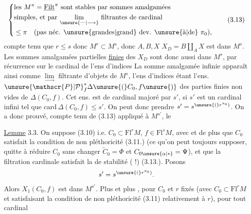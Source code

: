 \[
\left\{\begin{aligned}
&\text{les }M^\pi=\underline{\mathrm{Filt}}^\pi\text{ sont stables par sommes amalgamées}\\
&\text{simples, et par }\underset{\unsure{\mathrel{\text{---}}|\longrightarrow}}{\lim}\text{ filtrantes de cardinal}\\
&\le\pi\quad\text{(pas néc. \unsure{grandes|grand} dev. \unsure{à|de} }\pi_0),
\end{aligned}\right.
\tag*{(3.13)}
\]
compte tenu que $r\le s$ donc $M^r\subset M^s$, donc $A,B,X$  $X_D=B\amalg_A X$ est dans $M^s$. Les sommes amalgamées partielles \uline{finies} des $X_D$ sont donc aussi dans $M^s$, par récurrence sur le cardinal de l'ens d'indices\unsure{;|,}  La somme amalgamée infinie apparaît ainsi comme $\underset{\longrightarrow}{\lim}$ filtrante d'objets de $M^s$, l'ens d'indices étant l'ens. $\unsure{\mathscr{P}|\mathcal{P}}^*_f\Delta\unsure{(}C_0,f\unsure{)}$ des parties finies non vides de $\Delta(C_0,f)$. Cet ens. est de cardinal majoré par  $s'$,   si $s'$ est un cardinal infini tel que $\mathrm{card}\,\Delta(C_0,f)\le s'$. On peut donc prendre $s'=s^{\unsure{(}r^{\pi_0})}$.
On a donc prouvé, compte tenu de (3.13) appliqué à $M^{s'}$, le

\uline{Lemme} 3.3. On suppose (3.10) i.e. $C_0\subset\mathrm{Fl}^rM$, $f\in\mathrm{Fl}^sM$, avec   et de plus que $C_0$ satisfait la condition de non pléthoricité (3.11.) (ce qu'on peut toujours supposer, quitte à réduire $C_0$ sans changer $\widetilde{C}_0=\Phi$ et $C_{0\unsure{\alpha|*}}=\Psi$), et que la filtration cardinale satisfait la  de stabilité ( !) (3.13.). Posons
\[
s'=s^{\unsure{(}r^{\pi_0})}.
\]
Alors $X_1(C_0,f)$ est dans $M^{s'}$. Plus  et plus , pour $C_0$ et $r$ fixés (avec $C_0\subset\mathrm{Fl}^rM$ et satisfaisant la condition de non pléthoricité (3.11) relativement à $r$), pour tout cardinal
